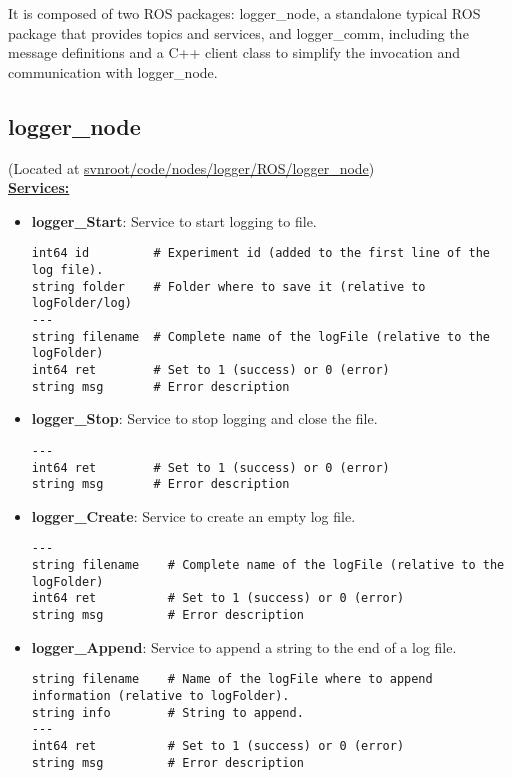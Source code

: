 \documentclass[letterpaper,notitlepage,11pt]{article}
\begin{document}
It is composed of two ROS packages: logger\_node, a standalone typical
ROS package that provides topics and services, and logger\_comm,
including the message definitions and a C++ client class to simplify
the invocation and communication with logger\_node.

\subsection{logger\_node}
\noindent (Located at \url{svnroot/code/nodes/logger/ROS/logger_node})
\\

\textbf{\underline{Services:}}

\begin{itemize}
\item \textbf{logger\_Start}: Service to start logging to file. 

\begin{verbatim}
int64 id         # Experiment id (added to the first line of the log file).
string folder    # Folder where to save it (relative to logFolder/log)
---
string filename  # Complete name of the logFile (relative to the logFolder)
int64 ret        # Set to 1 (success) or 0 (error)
string msg       # Error description
\end{verbatim}

\item \textbf{logger\_Stop}: Service to stop logging and close the file.

\begin{verbatim}
---
int64 ret        # Set to 1 (success) or 0 (error)
string msg       # Error description
\end{verbatim}

\item \textbf{logger\_Create}: Service to create an empty log file.

\begin{verbatim}
---
string filename    # Complete name of the logFile (relative to the logFolder)
int64 ret          # Set to 1 (success) or 0 (error)
string msg         # Error description
\end{verbatim}

\item \textbf{logger\_Append}: Service to append a string to the end
  of a log file.

\begin{verbatim}
string filename    # Name of the logFile where to append information (relative to logFolder).
string info        # String to append.
---
int64 ret          # Set to 1 (success) or 0 (error)
string msg         # Error description
\end{verbatim}


\end{itemize}
\end{document}
